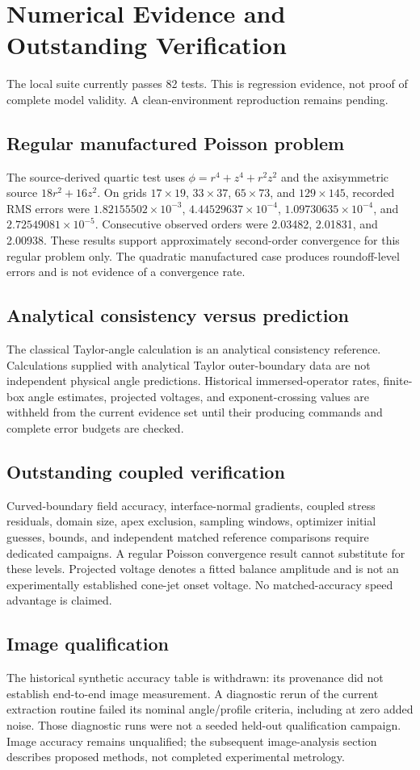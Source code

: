 \section{Numerical Evidence and Outstanding Verification}
The local suite currently passes 82 tests. This is regression evidence, not proof of complete model validity. A clean-environment reproduction remains pending.
\subsection{Regular manufactured Poisson problem}
The source-derived quartic test uses $\phi=r^4+z^4+r^2z^2$ and the axisymmetric source $18r^2+16z^2$. On grids $17\times19$, $33\times37$, $65\times73$, and $129\times145$, recorded RMS errors were $1.82155502\times10^{-3}$, $4.44529637\times10^{-4}$, $1.09730635\times10^{-4}$, and $2.72549081\times10^{-5}$. Consecutive observed orders were 2.03482, 2.01831, and 2.00938. These results support approximately second-order convergence for this regular problem only. The quadratic manufactured case produces roundoff-level errors and is not evidence of a convergence rate.
\subsection{Analytical consistency versus prediction}
The classical Taylor-angle calculation is an analytical consistency reference. Calculations supplied with analytical Taylor outer-boundary data are not independent physical angle predictions. Historical immersed-operator rates, finite-box angle estimates, projected voltages, and exponent-crossing values are withheld from the current evidence set until their producing commands and complete error budgets are checked.
\subsection{Outstanding coupled verification}
Curved-boundary field accuracy, interface-normal gradients, coupled stress residuals, domain size, apex exclusion, sampling windows, optimizer initial guesses, bounds, and independent matched reference comparisons require dedicated campaigns. A regular Poisson convergence result cannot substitute for these levels. Projected voltage denotes a fitted balance amplitude and is not an experimentally established cone-jet onset voltage. No matched-accuracy speed advantage is claimed.
\subsection{Image qualification}
The historical synthetic accuracy table is withdrawn: its provenance did not establish end-to-end image measurement. A diagnostic rerun of the current extraction routine failed its nominal angle/profile criteria, including at zero added noise. Those diagnostic runs were not a seeded held-out qualification campaign. Image accuracy remains unqualified; the subsequent image-analysis section describes proposed methods, not completed experimental metrology.
